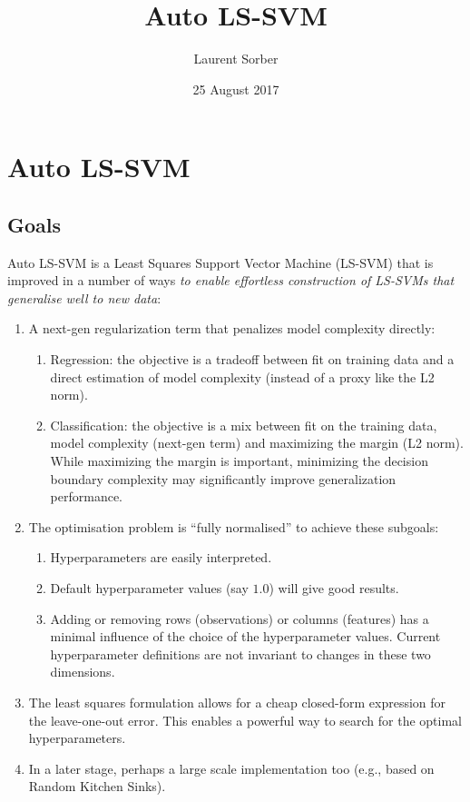\documentclass[12pt]{article}
\title{Auto LS-SVM}
\author{Laurent Sorber}
\date{25 August 2017}
\begin{document}
\maketitle

\section{Auto LS-SVM}

\subsection{Goals}

Auto LS-SVM is a Least Squares Support Vector Machine (LS-SVM) that is improved in a number of ways \textit{to enable effortless construction of LS-SVMs that generalise well to new data}:

\begin{enumerate}
\item A next-gen regularization term that penalizes model complexity directly:
\begin{enumerate}
    \item Regression: the objective is a tradeoff between fit on training data and a direct estimation of model complexity (instead of a proxy like the L2 norm).
    \item Classification: the objective is a mix between fit on the training data, model complexity (next-gen term) and maximizing the margin (L2 norm). While maximizing the margin is important, minimizing the decision boundary complexity may significantly improve generalization performance.
\end{enumerate}
\item The optimisation problem is ``fully normalised'' to achieve these subgoals:
\begin{enumerate}
    \item Hyperparameters are easily interpreted.
    \item Default hyperparameter values (say $1.0$) will give good results.
    \item Adding or removing rows (observations) or columns (features) has a minimal influence of the choice of the hyperparameter values. Current hyperparameter definitions are not invariant to changes in these two dimensions.
\end{enumerate}
\item The least squares formulation allows for a cheap closed-form expression for the leave-one-out error. This enables a powerful way to search for the optimal hyperparameters.
\item In a later stage, perhaps a large scale implementation too (e.g., based on Random Kitchen Sinks).
\end{enumerate}
\end{document}
